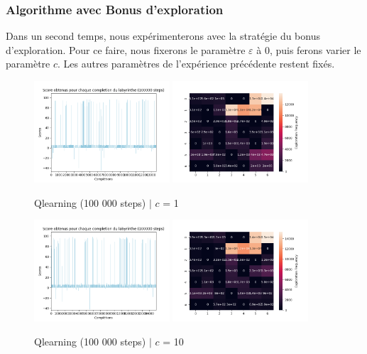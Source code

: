 \documentclass{article}
\begin{document}
\subsubsection{Algorithme avec Bonus d'exploration}
\label{subsubsec:exploitation}

\noindent Dans un second temps, nous expérimenterons avec la stratégie du bonus d'exploration. Pour ce faire, nous fixerons le paramètre $\varepsilon$ à 0, puis ferons varier le paramètre $c$. Les autres paramètres de l'expérience précédente restent fixés.

\begin{figure}[H]
    \centering
    {%
        \includegraphics[width=0.45\textwidth]{src/qlearning/bonus/bonus1.png}
    }\hfill
    {%
        \includegraphics[width=0.45\textwidth]{src/qlearning/bonus/bonus1heatmap.png}
    }
    \caption{Qlearning (100 000 steps) $|$ $c$ = 1}
    \label{fig:bonus1}
\end{figure}

\begin{figure}[H]
    \centering
    {%
        \includegraphics[width=0.45\textwidth]{src/qlearning/bonus/bonus10.png}
    }\hfill
    {%
        \includegraphics[width=0.45\textwidth]{src/qlearning/bonus/bonus10heatmap.png}
    }
    \caption{Qlearning (100 000 steps) $|$ $c$ = 10}
    \label{fig:bonus10}
\end{figure}
\end{document}
